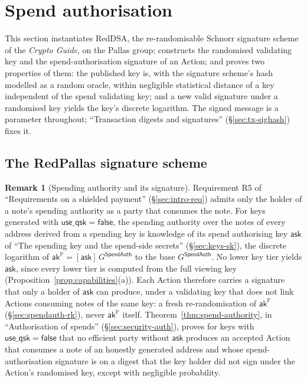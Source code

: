 \documentclass[11pt,a4paper]{article}
\theoremstyle{definition}
\newtheorem{remark}[theorem]{Remark}
\newcommand{\PP}{\mathbb{P}}
\newcommand{\ask}{\ensuremath{\mathsf{ask}}}
\newcommand{\aksym}{\ensuremath{\mathsf{ak}}}
\begin{document}
\section{Spend authorisation}\label{sec:spendauth}

This section instantiates RedDSA, the re-randomisable Schnorr signature
scheme of the \emph{Crypto Guide}, on the Pallas group; constructs the
randomised validating key and the spend-authorisation signature of an Action;
and proves two properties of them: the published key is, with the signature
scheme's hash modelled as a random oracle, within negligible statistical
distance of a key independent of the spend validating key; and a new valid
signature under a randomised key yields the key's discrete logarithm. The
signed message is a parameter throughout; ``Transaction digests and
signatures'' (\S\ref{sec:tx-sighash}) fixes it.

\subsection{The RedPallas signature scheme}\label{sec:spendauth-redpallas}

\begin{remark}[Spending authority and its signature]
Requirement R5 of ``Requirements on a shielded payment''
(\S\ref{sec:intro-req}) admits only the holder of a note's spending authority
as a party that consumes the note. For keys generated with
$\mathsf{use\_qsk} = \mathsf{false}$, the spending authority over the notes of
every address derived from a spending key is knowledge of its spend
authorising key $\ask$ of ``The spending key and the spend-side secrets''
(\S\ref{sec:keys-sk}), the discrete logarithm of
$\aksym^{\PP} = [\ask]\,G^{\mathsf{SpendAuth}}$ to the base
$G^{\mathsf{SpendAuth}}$. No lower key tier yields $\ask$, since every lower
tier is computed from the full viewing key
(Proposition~\ref{prop:capabilities}(a)). Each Action therefore carries a
signature that only a holder of $\ask$ can produce, under a validating key
that does not link Actions consuming notes of the same key: a fresh
re-randomisation of $\aksym^{\PP}$ (\S\ref{sec:spendauth-rk}), never
$\aksym^{\PP}$ itself. Theorem~\ref{thm:spend-authority}, in ``Authorisation
of spends'' (\S\ref{sec:security-auth}), proves for keys with
$\mathsf{use\_qsk} = \mathsf{false}$ that no efficient party without $\ask$
produces an accepted Action that consumes a note of an honestly generated
address and whose spend-authorisation signature is on a digest that the key
holder did not sign under the Action's randomised key, except with negligible
probability.
\end{remark}
\end{document}
